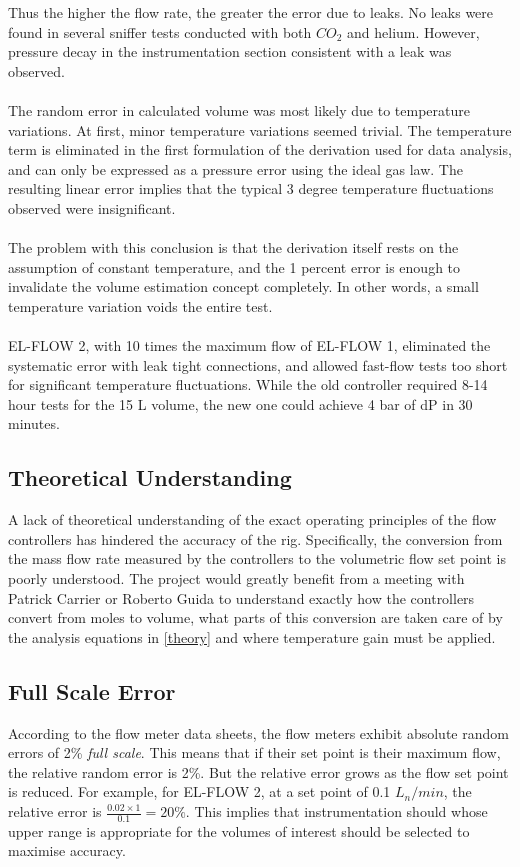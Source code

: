 \documentclass{report}
\begin{document}
Thus the higher the flow rate, the greater the error due to leaks. No leaks were found in several sniffer tests conducted with both $CO_2$ and helium. However, pressure decay in the instrumentation section consistent with a leak was observed. \\ \\
The random error in calculated volume was most likely due to temperature variations. At first, minor temperature variations seemed trivial. The temperature term is eliminated in the first formulation of the derivation used for data analysis, and can only be expressed as a pressure error using the ideal gas law. The resulting linear error implies that the typical 3 degree temperature fluctuations observed were insignificant. \\ \\ The problem with this conclusion is that the derivation itself rests on the assumption of constant temperature, and the 1 percent error is enough to invalidate the volume estimation concept completely. In other words, a small temperature variation voids the entire test. \\ \\
EL-FLOW 2, with 10 times the maximum flow of EL-FLOW 1,  eliminated the systematic error with leak tight connections, and allowed fast-flow tests too short for significant temperature fluctuations. While the old controller required 8-14 hour tests for the 15 L volume, the new one could achieve 4 bar of dP in 30 minutes. 
\subsection{Theoretical Understanding}
A lack of theoretical understanding of the exact operating principles of the flow controllers has hindered the accuracy of the rig. Specifically, the conversion from the mass flow rate measured by the controllers to the volumetric flow set point is poorly understood. The project would greatly benefit from a meeting with Patrick Carrier or Roberto Guida to understand exactly how the controllers convert from moles to volume, what parts of this conversion are taken care of by the analysis equations in \ref{theory} and where temperature gain must be applied.

\subsection{Full Scale Error}\label{fullScale}
According to the flow meter data sheets, the flow meters exhibit absolute random errors of 2\% \textit{full scale}.\cite{bronkhorst} This means that if their set point is their maximum flow, the relative random error is 2\%. But the relative error grows as the flow set point is reduced. For example, for EL-FLOW 2, at a set point of 0.1 $L_n/min$, the relative error is $\frac{0.02\times 1}{0.1} = 20\%$. This implies that instrumentation should whose upper range is appropriate for the volumes of interest should be selected to maximise accuracy.
\end{document}

